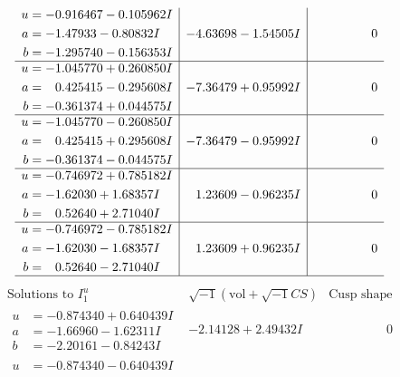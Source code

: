 \documentclass[1p]{elsarticle_modified}
\theoremstyle{definition}
\newcommand{\I}{\sqrt{-1}}
\begin{document}
$$\begin{array}{c|c|c}
\begin{aligned}
u &= -0.916467 - 0.105962 I \\
a &= -1.47933 - 0.80832 I \\
b &= -1.295740 - 0.156353 I\end{aligned}
 & -4.63698 - 1.54505 I & \phantom{-0.000000 } 0 \\ \hline\begin{aligned}
u &= -1.045770 + 0.260850 I \\
a &= \phantom{-}0.425415 - 0.295608 I \\
b &= -0.361374 + 0.044575 I\end{aligned}
 & -7.36479 + 0.95992 I & \phantom{-0.000000 } 0 \\ \hline\begin{aligned}
u &= -1.045770 - 0.260850 I \\
a &= \phantom{-}0.425415 + 0.295608 I \\
b &= -0.361374 - 0.044575 I\end{aligned}
 & -7.36479 - 0.95992 I & \phantom{-0.000000 } 0 \\ \hline\begin{aligned}
u &= -0.746972 + 0.785182 I \\
a &= -1.62030 + 1.68357 I \\
b &= \phantom{-}0.52640 + 2.71040 I\end{aligned}
 & \phantom{-}1.23609 - 0.96235 I & \phantom{-0.000000 } 0 \\ \hline\begin{aligned}
u &= -0.746972 - 0.785182 I \\
a &= -1.62030 - 1.68357 I \\
b &= \phantom{-}0.52640 - 2.71040 I\end{aligned}
 & \phantom{-}1.23609 + 0.96235 I & \phantom{-0.000000 } 0\\
 \hline 
 \end{array}$$\newpage$$\begin{array}{c|c|c}  
\text{Solutions to }I^u_{1}& \I (\text{vol} + \sqrt{-1}CS) & \text{Cusp shape}\\
 \hline 
\begin{aligned}
u &= -0.874340 + 0.640439 I \\
a &= -1.66960 - 1.62311 I \\
b &= -2.20161 - 0.84243 I\end{aligned}
 & -2.14128 + 2.49432 I & \phantom{-0.000000 } 0 \\ \hline\begin{aligned}
u &= -0.874340 - 0.640439 I \\

\end{aligned}
\end{array}$$
\end{document}
